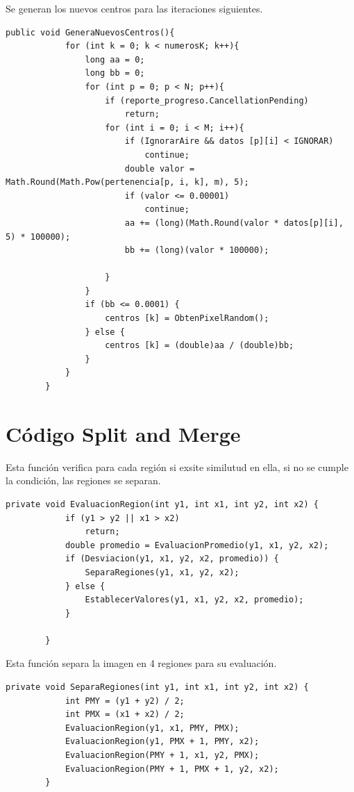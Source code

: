 \documentclass[12pt]{report}
\begin{document}
\newpage
\vspace*{2cm}
Se generan los nuevos centros para las iteraciones siguientes.
\lstset{language=C, breaklines=true, basicstyle=\footnotesize}
\lstset{numbers=left, numberstyle=\tiny, stepnumber=1, numbersep=-2pt}
\begin{lstlisting}[frame=single]
	public void GeneraNuevosCentros(){
            for (int k = 0; k < numerosK; k++){
                long aa = 0;
                long bb = 0;
                for (int p = 0; p < N; p++){
                    if (reporte_progreso.CancellationPending)
                        return;
                    for (int i = 0; i < M; i++){
                        if (IgnorarAire && datos [p][i] < IGNORAR)
                            continue;
                        double valor = Math.Round(Math.Pow(pertenencia[p, i, k], m), 5);
                        if (valor <= 0.00001)
                            continue;
                        aa += (long)(Math.Round(valor * datos[p][i], 5) * 100000);
                        bb += (long)(valor * 100000);
                        
                    }
                }
                if (bb <= 0.0001) {
                    centros [k] = ObtenPixelRandom();
                } else {
                    centros [k] = (double)aa / (double)bb;
                }
            }
        }
\end{lstlisting}

\chapter{Código Split and Merge}
Esta función verifica para cada región si exsite similutud en ella, si no se cumple la condición, las regiones se separan.
\lstset{language=C, breaklines=true, basicstyle=\footnotesize}
\lstset{numbers=left, numberstyle=\tiny, stepnumber=1, numbersep=-2pt}
\begin{lstlisting}[frame=single]
	private void EvaluacionRegion(int y1, int x1, int y2, int x2) {
            if (y1 > y2 || x1 > x2)
                return;
            double promedio = EvaluacionPromedio(y1, x1, y2, x2);
            if (Desviacion(y1, x1, y2, x2, promedio)) {
                SeparaRegiones(y1, x1, y2, x2);
            } else {
                EstablecerValores(y1, x1, y2, x2, promedio);
            }

        }
\end{lstlisting}

\vspace{1cm}
Esta función separa la imagen en 4 regiones para su evaluación.
\lstset{language=C, breaklines=true, basicstyle=\footnotesize}
\lstset{numbers=left, numberstyle=\tiny, stepnumber=1, numbersep=-2pt}
\begin{lstlisting}[frame=single]
	private void SeparaRegiones(int y1, int x1, int y2, int x2) {
            int PMY = (y1 + y2) / 2;
            int PMX = (x1 + x2) / 2;
            EvaluacionRegion(y1, x1, PMY, PMX);
            EvaluacionRegion(y1, PMX + 1, PMY, x2);
            EvaluacionRegion(PMY + 1, x1, y2, PMX);
            EvaluacionRegion(PMY + 1, PMX + 1, y2, x2);
        }
\end{lstlisting}
\end{document}
